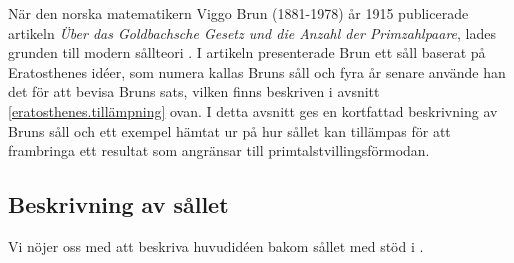 \begin{comment}
När den norska matematikern Viggo Brun (1881-1978) år 1915 publicerade artikeln \textit{Über das Goldbachsche Gesetz und die Anzahl der Primzahlpaare}, lades grunden till modern sållteori \cite{ViggoBrun}. 
I artikeln presenterade Brun ett såll baserat på Eratosthenes idéer, som numera kallas Bruns såll och fyra år senare använde han det för att bevisa att summan av reciproker $\frac{1}{p_1}+\frac{1}{p_2}+...$ av primtalstvillingar $p_1,p_2,...$ konvergerar \cite{ViggoBrun}.
I detta avsnitt ges en kortfattad beskrivning av Bruns såll och ett exempel taget ur \cite{cojocarumurty} på hur sållet kan tillämpas för att ge ett resultat som angränsar till primtalstvillingsförmodan.
\end{comment}

När den norska matematikern Viggo Brun (1881-1978) år 1915 publicerade artikeln \textit{Über das Goldbachsche Gesetz und die Anzahl der Primzahlpaare}, lades grunden till modern sållteori \cite{ViggoBrun}. 
I artikeln presenterade Brun ett såll baserat på Eratosthenes idéer, som numera kallas Bruns såll och fyra år senare använde han det för att bevisa Bruns sats, vilken finns beskriven i avsnitt \ref{eratosthenes.tillämpning} ovan.
I detta avsnitt ges en kortfattad beskrivning av Bruns såll och ett exempel hämtat ur \cite{cojocarumurty} på hur sållet kan tillämpas för att frambringa ett resultat som angränsar till primtalstvillingsförmodan.


\subsection{Beskrivning av sållet}
Vi nöjer oss med att beskriva huvudidéen bakom sållet med stöd i \cite[kap 6.2]{cojocarumurty}. %

